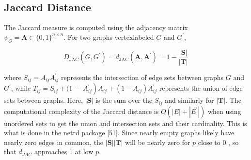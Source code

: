 \subsection{Jaccard Distance}
The Jaccard measure is computed using the adjacency matrix $\psi_{G}=\mathbf{A} \in\{0,1\}^{n \times n}$. For two graphs vertexlabeled $G$ and $G^{\prime}$,

$$
D_{\mathrm{JAC}}\left(G, G^{\prime}\right)=d_{\mathrm{JAC}}\left(\mathbf{A}, \mathbf{A}^{\prime}\right)=1-\frac{|\mathbf{S}|}{|\mathbf{T}|}
$$

where $S_{i j}=A_{i j} A_{i j}^{\prime}$ represents the intersection of edge sets between graphs $G$ and $G^{\prime}$, while $T_{i j}=S_{i j}+(1-$ $\left.A_{i j}^{\prime}\right) A_{i j}+\left(1-A_{i j}\right) A_{i j}^{\prime}$ represents the union of edge sets between graphs. Here, $|\mathbf{S}|$ is the sum over the $S_{i j}$ and similarly for $|\mathbf{T}|$. The computational complexity of the Jaccard distance is $O\left(|E|+\left|E^{\prime}\right|\right)$ when using unordered sets to get the union and intersection sets and their cardinality. This is what is done in the netrd package [51]. Since nearly empty graphs likely have nearly zero edges in common, the $|\mathbf{S}||\mathbf{T}|$ will be nearly zero for $p$ close to 0 , so that $d_{J A C}$ approaches 1 at low $p$.

